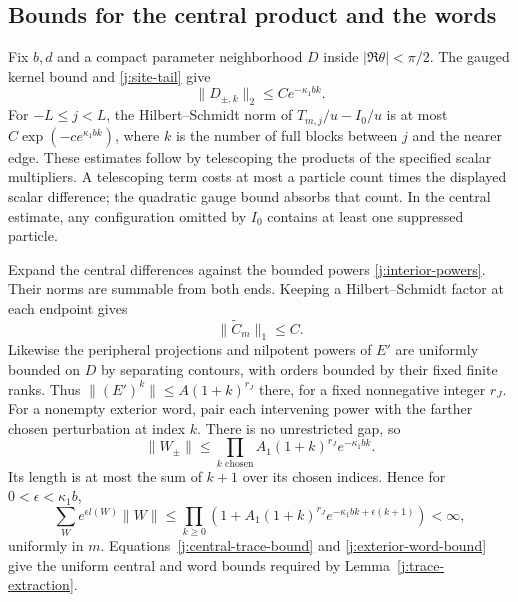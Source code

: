 

\subsection{Bounds for the central product and the words}

Fix $b,d$ and a compact parameter neighborhood $D$ inside
$|\Re\theta|<\pi/2$. The gauged kernel bound and \eqref{j:site-tail} give
\begin{equation}\label{j:defect-bounds}
 \|D_{\pm,k}\|_2\le Ce^{-\kappa_1bk}.
\end{equation}
For $-L\le j<L$, the Hilbert--Schmidt norm of
$T_{m,j}/u-I_0/u$ is at most
$C\exp(-c e^{\kappa_1bk})$, where $k$ is the number of full blocks
between $j$ and the nearer edge. These estimates follow by telescoping
the products of the specified scalar multipliers. A telescoping term
costs at most a particle count times the displayed scalar difference;
the quadratic gauge bound absorbs that count. In the central estimate,
any configuration omitted by $I_0$ contains at least one suppressed
particle.

Expand the central differences against the bounded powers
\eqref{j:interior-powers}. Their norms are summable from both ends.
Keeping a Hilbert--Schmidt factor at each endpoint gives
\begin{equation}\label{j:central-trace-bound}
 \|\widetilde C_m\|_1\le C.
\end{equation}
Likewise the peripheral projections and nilpotent powers of $E'$ are
uniformly bounded on $D$ by separating contours, with orders bounded by
their fixed finite ranks. Thus $\|(E')^k\|\le A(1+k)^{r_J}$ there, for a
fixed nonnegative integer $r_J$. For a nonempty exterior word, pair each
intervening power with the farther
chosen perturbation at index $k$. There is no unrestricted gap, so
\[
 \|W_\pm\|\le
 \prod_{k\text{ chosen}}A_1(1+k)^{r_J} e^{-\kappa_1bk}.
\]
Its length is at most the sum of $k+1$ over its chosen indices. Hence for
$0<\epsilon<\kappa_1b$,
\begin{equation}\label{j:exterior-word-bound}
 \sum_W e^{\epsilon l(W)}\|W\|
 \le\prod_{k\ge0}
 \left(1+A_1(1+k)^{r_J} e^{-\kappa_1bk+\epsilon(k+1)}\right)<\infty,
\end{equation}
uniformly in $m$. Equations~\eqref{j:central-trace-bound} and
\eqref{j:exterior-word-bound} give the uniform central and word bounds
required by Lemma~\ref{j:trace-extraction}.

